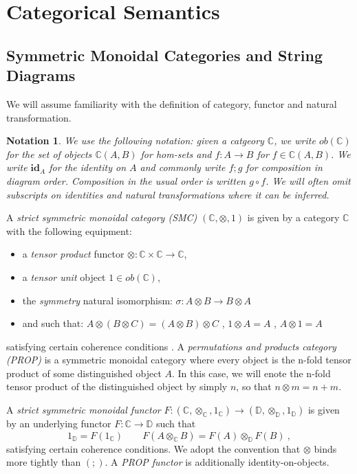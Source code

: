 
\newtheorem*{notation*}{Notation}

\section{Categorical Semantics}

\subsection{Symmetric Monoidal Categories and String Diagrams}

We will assume familiarity with the definition of category,  functor and natural transformation.
\begin{notation*}
We use the following notation: given a catgeory $\mathbb{C}$, we write $ob(\mathbb{C})$ for the set of objects $\mathbb{C}(A,B)$ for hom-sets and $f: A \to B$ for $f \in \mathbb{C}(A,B)$. We write $\textbf{id}_A$ for the identity on $A$ and commonly write $f;g$ for composition in diagram order.  Composition in the usual order is written $g \circ f$. 
We will often omit subscripts on identities and natural transformations where it can be inferred. 
\end{notation*}
\begin{definition}
A \textit{strict symmetric monoidal category (SMC)} $(\mathbb{C}, \otimes, 1)$ is given by a category $\mathbb{C}$ with the following equipment: 
\begin{itemize}
\item a \textit{tensor product} functor $\otimes: \mathbb{C} \times \mathbb{C} \to \mathbb{C}$,
\item a \textit{tensor unit} object $1 \in ob(\mathbb{C})$, 
\item the \textit{symmetry} natural isomorphism: $\sigma: A \otimes B \to B \otimes A$
\item and such that: $A \otimes (B \otimes C) = (A \otimes B) \otimes C$ ,  $1 \otimes A = A$ ,  $A \otimes 1 = A$
\end{itemize}
satisfying certain coherence conditions 
\cite{maclane}.  A \textit{permutations and products category (PROP)} is a symmetric monoidal category where every object is the n-fold tensor product of some distinguished object $A$. In this case, we will enote the n-fold tensor product of the distinguished object by simply $n$, so that $n \otimes m = n+m$.

A \textit{strict symmetric monoidal functor} $F: (\mathbb{C}, \otimes_\mathbb{C}, 1_\mathbb{C}) \to (\mathbb{D}, \otimes_\mathbb{D}, 1_\mathbb{D})$ is given by an underlying functor $F: \mathbb{C} \to \mathbb{D}$ such that 
\[
 1_{\mathbb{D}} = F(1_{\mathbb{C}})
 \qquad F(A \otimes_{\mathbb{C}} B) = F(A) \otimes_{\mathbb{D}} F(B)\ ,
\]
satisfying certain coherence conditions. 
We adopt the convention that $\otimes$ binds more tightly than $(;\!)$. 
A \textit{PROP functor} is additionally identity-on-objects. 
\end{definition}

